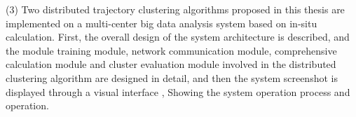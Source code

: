 \begin{englishabstract}
(3) Two distributed trajectory clustering algorithms proposed in this thesis are implemented on a multi-center big data analysis system based on in-situ calculation. First, the overall design of the system architecture is described, and the module training module, network communication module, comprehensive calculation module and cluster evaluation module involved in the distributed clustering algorithm are designed in detail, and then the system screenshot is displayed through a visual interface , Showing the system operation process and operation.
	
\end{englishabstract}


